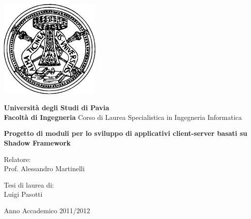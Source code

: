 \frenchspacing
\frontmatter
\begin{titlepage}
\linespread{1}
	\thispagestyle{empty}
	
	\begin{center}
		\vskip 1cm
		\includegraphics[width=5cm]{Immagini/Unipv-logo-vett}
		\vskip 0.5cm
		
		\LARGE
			\textbf{Universit\`a degli Studi di Pavia}\\
			\textbf{Facolt\`a di Ingegneria}
			\vskip 0.5cm
		\Large
			Corso di Laurea Specialistica in Ingegneria Informatica
		
		\vskip 1.5cm
		\Huge
			\textbf{Progetto di moduli per lo sviluppo di applicativi client-server basati su Shadow Framework}
		\vskip 2.5cm
		
		\Large
			\begin{minipage}[t]{7cm}
				Relatore:\\
				Prof. Alessandro Martinelli\\


			\end{minipage}
			\hfill
			\begin{minipage}[t]{5cm}
				Tesi di laurea di:\\
				Luigi Pasotti\\
			\end{minipage}
			
			\vskip 3.5cm
			Anno Accademico 2011/2012
	\end{center}
	
	\vfill
	\eject
\end{titlepage}